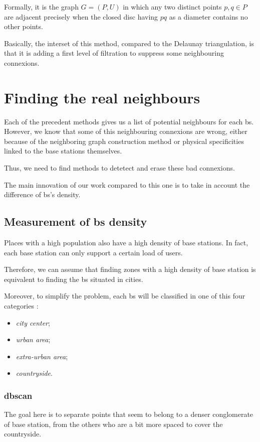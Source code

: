 \documentclass[lettersize,journal,english]{IEEEtran}
\begin{document}
Formally, it is the graph $G = (P, U)$ in which any two distinct points $p, q \in P$ are adjacent precisely when the closed disc having $pq$ as a diameter contains no other points.

Basically, the interset of this method, compared to the Delaunay triangulation, is that it is adding a first level of filtration to suppress some neighbouring connexions.

\section{Finding the real neighbours}
\noindent Each of the precedent methods gives us a list of potential neighbours for each \acrshort{bs}. However, we know that some of this neighbouring connexions are wrong,
either because of the neighboring graph construction method or physical specificities linked to the base stations themselves.

Thus, we need to find methods to detetect and erase these bad connexions.

The main innovation of our work compared to this one \cite{art_del_paq} is to take in account the difference of \acrshort{bs}'s density.

\subsection{Measurement of \acrshort{bs} density}
\noindent Places with a high population also have a high density of base stations. In fact, each base station can only support a certain
load of users.

Therefore, we can assume that finding zones with a high density of base station is equivalent to finding the \acrshort{bs} 
situated in \og cities\fg{}.

Moreover, to simplify the problem, each \acrshort{bs} will be classified in one of this four categories :
\begin{itemize}
    \item \emph{city center};
    \item \emph{urban area};
    \item \emph{extra-urban area};
    \item \emph{countryside}.
\end{itemize}

\subsubsection{\acrshort{dbscan}}
The goal here is to separate points that seem to belong to a denser conglomerate of base station, from the others who are a bit more spaced
to cover the countryside.
\end{document}
